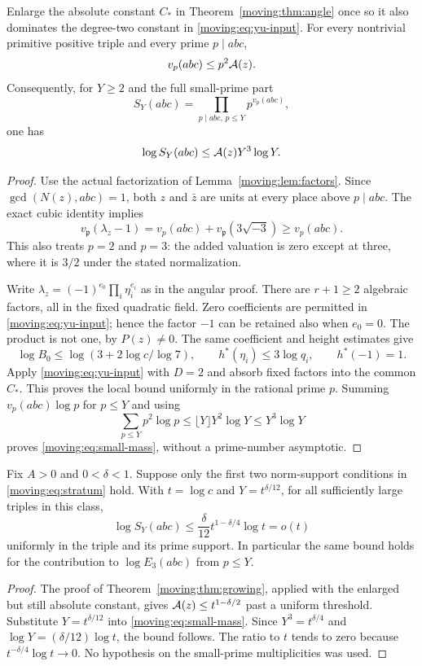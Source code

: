 \begin{theorem}\label{moving:thm:adic-local}
Enlarge the absolute constant $C_*$ in Theorem~\ref{moving:thm:angle} once so it also dominates the degree-two constant in \eqref{moving:eq:yu-input}. For every nontrivial primitive positive triple and every prime $p\mid abc$,
\[
 v_p(abc)\le p^2\mathcal A(z).
\]
Consequently, for $Y\ge2$ and the full small-prime part
\[
 S_Y(abc)=\prod_{p\mid abc,\,p\le Y}p^{v_p(abc)},
\]
one has
\begin{equation}\label{moving:eq:small-mass}
 \log S_Y(abc)\le \mathcal A(z)Y^3\log Y.
\end{equation}
\end{theorem}
\begin{proof}
Use the actual factorization of Lemma~\ref{moving:lem:factors}. Since $\gcd(N(z),abc)=1$, both $z$ and $\bar z$ are units at every place above $p\mid abc$. The exact cubic identity implies
\[
 v_{\mathfrak p}(\lambda_z-1)
  =v_p(abc)+v_{\mathfrak p}(3\sqrt{-3})
  \ge v_p(abc).
\]
This also treats $p=2$ and $p=3$: the added valuation is zero except at three, where it is $3/2$ under the stated normalization.

Write $\lambda_z=(-1)^{e_0}\prod_i\eta_i^{e_i}$ as in the angular proof. There are $r+1\ge2$ algebraic factors, all in the fixed quadratic field. Zero coefficients are permitted in \eqref{moving:eq:yu-input}; hence the factor $-1$ can be retained also when $e_0=0$. The product is not one, by $P(z)\ne0$. The same coefficient and height estimates give
\[
 \log B_0\le\log(3+2\log c/\log7),\qquad
 h^*(\eta_i)\le3\log q_i,\qquad h^*(-1)=1.
\]
Apply \eqref{moving:eq:yu-input} with $D=2$ and absorb fixed factors into the common $C_*$. This proves the local bound uniformly in the rational prime $p$. Summing $v_p(abc)\log p$ for $p\le Y$ and using
\[
 \sum_{p\le Y}p^2\log p\le \lfloor Y\rfloor Y^2\log Y\le Y^3\log Y
\]
proves \eqref{moving:eq:small-mass}, without a prime-number asymptotic.
\end{proof}

\begin{corollary}\label{moving:cor:small-free}
Fix $A>0$ and $0<\delta<1$. Suppose only the first two norm-support conditions in \eqref{moving:eq:stratum} hold. With $t=\log c$ and $Y=t^{\delta/12}$, for all sufficiently large triples in this class,
\[
 \log S_Y(abc)\le \frac{\delta}{12}
            t^{1-\delta/4}\log t=o(t)
\]
uniformly in the triple and its prime support. In particular the same bound holds for the contribution to $\log E_3(abc)$ from $p\le Y$.
\end{corollary}
\begin{proof}
The proof of Theorem~\ref{moving:thm:growing}, applied with the enlarged but still absolute constant, gives $\mathcal A(z)\le t^{1-\delta/2}$ past a uniform threshold. Substitute $Y=t^{\delta/12}$ into \eqref{moving:eq:small-mass}. Since $Y^3=t^{\delta/4}$ and $\log Y=(\delta/12)\log t$, the bound follows. The ratio to $t$ tends to zero because $t^{-\delta/4}\log t\to0$. No hypothesis on the small-prime multiplicities was used.
\end{proof}


